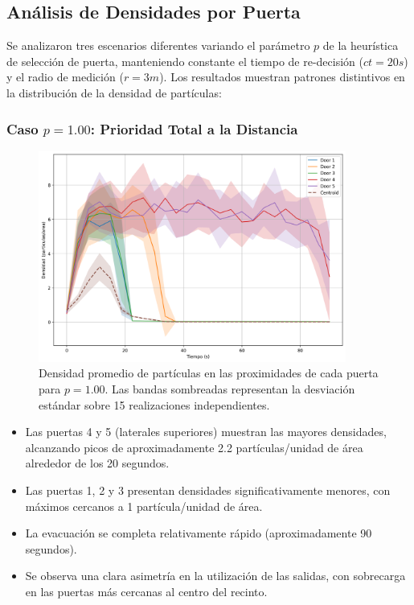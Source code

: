 \documentclass[12pt]{article}
\begin{document}
\subsection{Análisis de Densidades por Puerta}

Se analizaron tres escenarios diferentes variando el parámetro $p$ de la heurística de selección de puerta, manteniendo constante el tiempo de re-decisión ($ct=20s$) y el radio de medición ($r=3m$). Los resultados muestran patrones distintivos en la distribución de la densidad de partículas:

\subsubsection{Caso $p = 1.00$: Prioridad Total a la Distancia}

\begin{figure}[H]
    \centering
    \includegraphics[width=0.9\textwidth]{img/circular_density_t_20_&_p_1.00.png}
    \caption{Densidad promedio de partículas en las proximidades de cada puerta para $p=1.00$. Las bandas sombreadas representan la desviación estándar sobre 15 realizaciones independientes.}
    \label{fig:densidad_p100}
\end{figure}

\begin{itemize}
    \item Las puertas 4 y 5 (laterales superiores) muestran las mayores densidades, alcanzando picos de aproximadamente 2.2 partículas/unidad de área alrededor de los 20 segundos.
    \item Las puertas 1, 2 y 3 presentan densidades significativamente menores, con máximos cercanos a 1 partícula/unidad de área.
    \item La evacuación se completa relativamente rápido (aproximadamente 90 segundos).
    \item Se observa una clara asimetría en la utilización de las salidas, con sobrecarga en las puertas más cercanas al centro del recinto.
\end{itemize}
\end{document}
